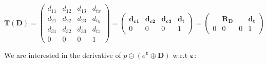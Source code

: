 \documentclass[a4paper,11pt]{report}
\newcommand{\E}{{\bm{\varepsilon}}}
\begin{document}
\begin{equation}
\mathbf{T}(\mathbf{D}) = 
\left(
\begin{array}{ccc|c}
 d_{11} & d_{12} & d_{13} & d_{tx}   \\
 d_{21} & d_{22} & d_{23} & d_{ty}   \\
 d_{31} & d_{32} & d_{33} & d_{tz}   \\
\hline
  0 & 0 & 0 & 1
\end{array}
\right) 
=
\left(
\begin{array}{ccc|c}
 \mathbf{d_{c1}}  & \mathbf{d_{c2}}  & \mathbf{d_{c3}}  & \mathbf{d_{t}}  \\
\hline
  0 & 0 & 0 & 1
\end{array}
\right)
= 
\left(
\begin{array}{ccc|c}
   & \mathbf{R_D}  &  & \mathbf{d_{t}}  \\
\hline
  0 & 0 & 0 & 1
\end{array}
\right)
\end{equation}

We are interested in the derivative of $p \ominus (e^\E \oplus \mathbf{D})$ w.r.t $\E$:
\end{document}
